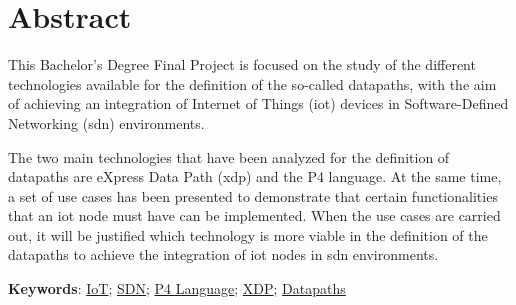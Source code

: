 \chapter{Abstract}
\thispagestyle{empty}

This Bachelor's Degree Final Project is focused on the study of the different technologies available for the definition of the so-called datapaths, with the aim of achieving an integration of Internet of Things (\gls{iot}) devices in Software-Defined Networking (\gls{sdn}) environments. \newline

The two main technologies that have been analyzed for the definition of datapaths are
eXpress Data Path (\gls{xdp}) and the P4 language. At the same time, a set of use cases has been presented to demonstrate that certain functionalities that an \gls{iot} node must have can be implemented. When the use cases are carried out, it will be justified which technology is more viable in the definition of the datapaths to achieve the integration of \gls{iot} nodes in \gls{sdn} environments.

\vspace{1cm}

\textbf{Keywords}: \href{https://scholar.google.es/scholar?q=Internet+of+Things}{IoT}; \href{https://www.opennetworking.org/sdn-definition}{SDN};
\href{https://p4.org/}{P4 Language}; \href{https://scholar.google.es/scholar?q=XDP+linux}{XDP};
\href{https://scholar.google.es/scholar?q=Datapaths}{Datapaths}



\cleardoublepage %




